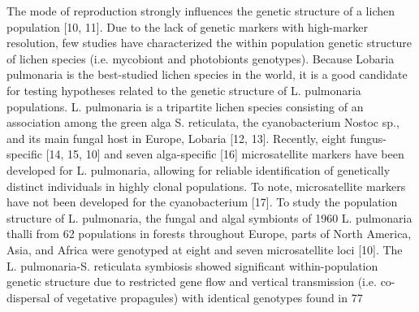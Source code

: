 \documentclass[runningheads,a4paper]{llncs}
\begin{document}
The mode of reproduction strongly influences the genetic structure of a lichen population [10, 11]. Due to the lack of genetic markers with high-marker resolution, few studies have characterized the within population genetic structure of lichen species (i.e. mycobiont and photobionts genotypes). Because Lobaria pulmonaria is the best-studied lichen species in the world, it is a good candidate for testing hypotheses related to the genetic structure of L. pulmonaria  populations. L. pulmonaria is a tripartite lichen species consisting of an association among the green alga S. reticulata, the cyanobacterium Nostoc sp., and its main fungal host in Europe, Lobaria [12, 13]. Recently, eight fungus-specific [14, 15, 10] and seven alga-specific [16] microsatellite markers have been developed for L. pulmonaria, allowing for reliable identification of genetically distinct individuals in highly clonal populations. To note, microsatellite markers have not been developed for the cyanobacterium [17]. 
To study the population structure of L. pulmonaria, the fungal and algal symbionts of 1960 L. pulmonaria thalli from 62 populations in forests throughout Europe, parts of North America, Asia, and Africa were genotyped at eight and seven microsatellite loci [10]. The L. pulmonaria-S. reticulata symbiosis showed significant within-population genetic structure due to restricted gene flow and vertical transmission (i.e. co-dispersal of vegetative propagules) with identical genotypes found in 77%
\end{document}
